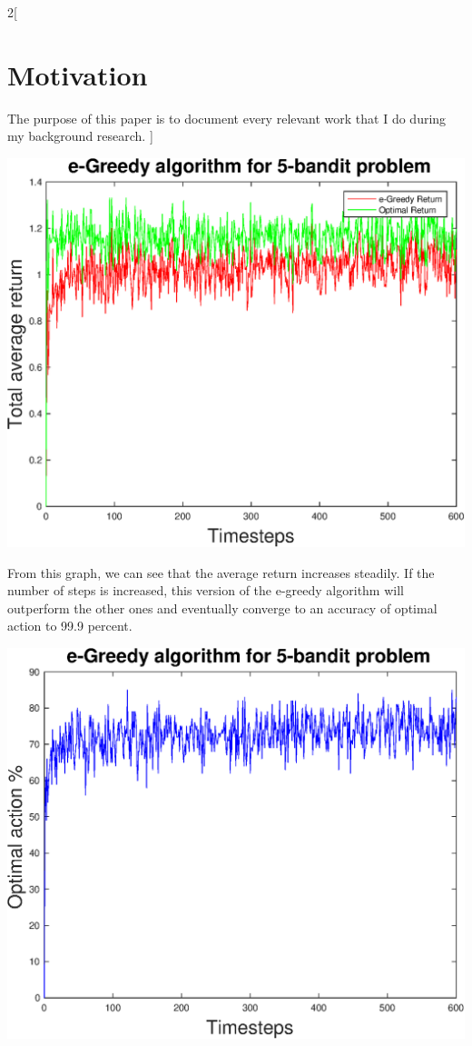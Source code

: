 \documentclass[a4paper]{article}
\newenvironment{Figure}
{\par\medskip\noindent\minipage{\linewidth}}
{\endminipage\par\medskip}
\begin{document}
\begin{multicols}{2}[
		\section*{Motivation}
		The purpose of this paper is to document every relevant work that I do during my background research.
		]
		\begin{Figure}
			\centering
			\includegraphics[width=\linewidth]{egreedyplot3.eps}
		\end{Figure}
		
		From this graph, we can see that the average return increases steadily. If the number of steps is increased, this version of the e-greedy algorithm will outperform the other ones and eventually converge to an accuracy of optimal action to 99.9 percent.
		
		\begin{Figure}
			\centering
			\includegraphics[width=\linewidth]{egreedyplot4.eps}
		\end{Figure}
	

\end{multicols}
\end{document}
